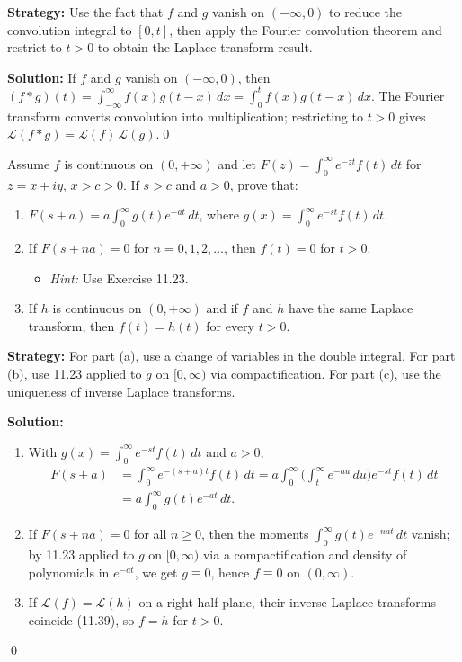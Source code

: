\noindent\textbf{Strategy:} Use the fact that $f$ and $g$ vanish on $(-\infty,0)$ to reduce the convolution integral to $[0,t]$, then apply the Fourier convolution theorem and restrict to $t>0$ to obtain the Laplace transform result.

\bigskip\noindent\textbf{Solution:}
If $f$ and $g$ vanish on $(-\infty,0)$, then $(f*g)(t)=\int_{-\infty}^{\infty} f(x)g(t-x)\,dx=\int_0^t f(x)g(t-x)\,dx$. The Fourier transform converts convolution into multiplication; restricting to $t>0$ gives $\mathcal L(f*g)=\mathcal L(f)\,\mathcal L(g)$.\qed


\begin{problembox}
Assume $f$ is continuous on $(0, +\infty)$ and let $F(z) = \int_0^\infty e^{-zt} f(t) \, dt$ for $z = x + iy$, $x > c > 0$. If $s > c$ and $a > 0$, prove that:
\begin{enumerate}[label=(\alph*)]
\item $F(s + a) = a \int_0^\infty g(t) e^{-at} \, dt$, where $g(x) = \int_0^\infty e^{-st} f(t) \, dt$.
\item If $F(s + na) = 0$ for $n = 0, 1, 2, \dots$, then $f(t) = 0$ for $t > 0$.
\begin{itemize}
\item \textit{Hint:} Use Exercise 11.23.
\end{itemize}
\item If $h$ is continuous on $(0, +\infty)$ and if $f$ and $h$ have the same Laplace transform, then $f(t) = h(t)$ for every $t > 0$.
\end{enumerate}
\end{problembox}

\noindent\textbf{Strategy:} For part (a), use a change of variables in the double integral. For part (b), use 11.23 applied to $g$ on $[0,\infty)$ via compactification. For part (c), use the uniqueness of inverse Laplace transforms.

\bigskip\noindent\textbf{Solution:}
\begin{enumerate}[label=(\alph*)]
\item With $g(x)=\int_0^{\infty} e^{-st} f(t)\,dt$ and $a>0$,
\begin{align*} 
F(s+a)&=\int_0^{\infty} e^{-(s+a)t}f(t)\,dt=a\int_0^{\infty} \Big(\int_t^{\infty} e^{-au}\,du\Big) e^{-st}f(t)\,dt\\
&=a\int_0^{\infty} g(t)e^{-at}\,dt.
\end{align*}
\item If $F(s+na)=0$ for all $n\ge0$, then the moments $\int_0^{\infty} g(t) e^{-nat}\,dt$ vanish; by 11.23 applied to $g$ on $[0,\infty)$ via a compactification and density of polynomials in $e^{-at}$, we get $g\equiv0$, hence $f\equiv0$ on $(0,\infty)$.
\item If $\mathcal L(f)=\mathcal L(h)$ on a right half-plane, their inverse Laplace transforms coincide (11.39), so $f=h$ for $t>0$.
\end{enumerate}\qed


